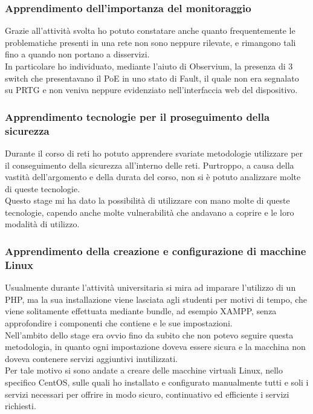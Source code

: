 \documentclass[Tesi.tex]{subfiles}
\begin{document}
\subsubsection{Apprendimento dell'importanza del monitoraggio}
Grazie all'attività svolta ho potuto constatare anche quanto frequentemente le problematiche presenti in una rete non sono neppure rilevate, e rimangono tali fino a quando non portano a disservizi. \\
In particolare ho individuato, mediante l'aiuto di Observium, la presenza di 3 switch che presentavano il PoE in uno stato di Fault, il quale non era segnalato su PRTG e non veniva neppure evidenziato nell'interfaccia web del dispositivo.

\subsubsection{Apprendimento tecnologie per il proseguimento della sicurezza}
Durante il corso di reti ho potuto apprendere svariate metodologie utilizzare per il conseguimento della sicurezza all'interno delle reti. Purtroppo, a causa della vastità dell'argomento e della durata del corso, non si è potuto analizzare molte di queste tecnologie. \\
Questo stage mi ha dato la possibilità di utilizzare con mano molte di queste tecnologie, capendo anche molte vulnerabilità che andavano a coprire e le loro modalità di utilizzo.

\subsubsection{Apprendimento della creazione e configurazione di macchine Linux}
Usualmente durante l'attività universitaria si mira ad imparare l'utilizzo di un PHP, ma la sua installazione viene lasciata agli studenti per motivi di tempo, che viene solitamente effettuata mediante bundle, ad esempio XAMPP, senza approfondire i componenti che contiene e le sue impostazioni. \\
Nell'ambito dello stage era ovvio fino da subito che non potevo seguire questa metodologia, in quanto ogni impostazione doveva essere sicura e la macchina non doveva contenere servizi aggiuntivi inutilizzati. \\
Per tale motivo si sono andate a creare delle macchine virtuali Linux, nello specifico CentOS, sulle quali ho installato e configurato manualmente tutti e soli i servizi necessari per offrire in modo sicuro, continuativo ed efficiente i servizi richiesti.
\end{document}
